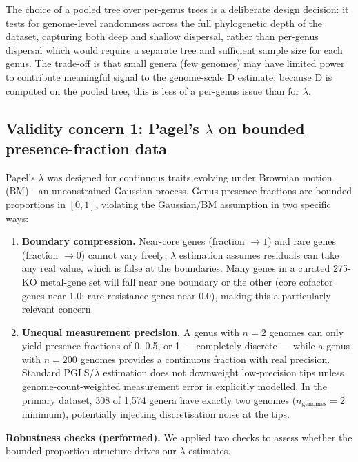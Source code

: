 \documentclass[11pt]{article}
\begin{document}
The choice of a pooled tree over per-genus trees is a deliberate design decision: it tests for genome-level randomness across the full phylogenetic depth of the dataset, capturing both deep and shallow dispersal, rather than per-genus dispersal which would require a separate tree and sufficient sample size for each genus.
The trade-off is that small genera (few genomes) may have limited power to contribute meaningful signal to the genome-scale D estimate; because D is computed on the pooled tree, this is less of a per-genus issue than for $\lambda$.

\subsection{Validity concern 1: Pagel's $\lambda$ on bounded presence-fraction data}

Pagel's $\lambda$ was designed for continuous traits evolving under Brownian motion (BM)---an unconstrained Gaussian process.
Genus presence fractions are bounded proportions in $[0, 1]$, violating the Gaussian/BM assumption in two specific ways:

\begin{enumerate}
\item \textbf{Boundary compression.} Near-core genes (fraction $\to 1$) and rare genes (fraction $\to 0$) cannot vary freely; $\lambda$ estimation assumes residuals can take any real value, which is false at the boundaries.
Many genes in a curated 275-KO metal-gene set will fall near one boundary or the other (core cofactor genes near 1.0; rare resistance genes near 0.0), making this a particularly relevant concern.

\item \textbf{Unequal measurement precision.}
A genus with $n = 2$ genomes can only yield presence fractions of 0, 0.5, or 1 --- completely discrete --- while a genus with $n = 200$ genomes provides a continuous fraction with real precision.
Standard PGLS/$\lambda$ estimation does not downweight low-precision tips unless genome-count-weighted measurement error is explicitly modelled.
In the primary dataset, 308 of 1,574 genera have exactly two genomes ($n_\text{genomes} = 2$ minimum), potentially injecting discretisation noise at the tips.
\end{enumerate}

\textbf{Robustness checks (performed).}
We applied two checks to assess whether the bounded-proportion structure drives our $\lambda$ estimates.
\end{document}
